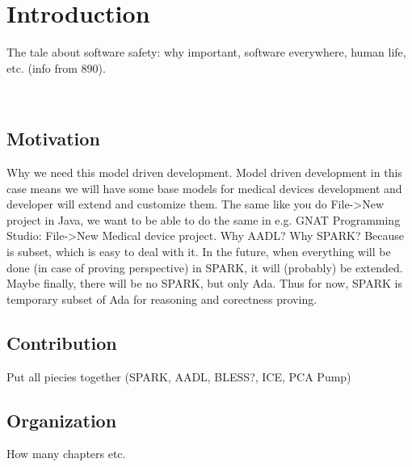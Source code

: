 
\cleardoublepage


\chapter{Introduction}
\label{introduction}

The tale about software safety: why important, software everywhere, human life, etc. (info from 890).

\

\section{Motivation}
\label{introduction:motivation}
Why we need this model driven development.
Model driven development in this case means we will have some base models for medical devices development and developer will extend and customize them. The same like you do File->New project in Java, we want to be able to do the same in e.g. GNAT Programming Studio: File->New Medical device project.
Why AADL?
Why SPARK? Because is subset, which is easy to deal with it. In the future, when everything will be done (in case of proving perspective) in SPARK, it will (probably) be extended. Maybe finally, there will be no SPARK, but only Ada. Thus for now, SPARK is temporary subset of Ada for reasoning and corectness proving.

\section{Contribution}
\label{introduction:contribution}
Put all piecies together (SPARK, AADL, BLESS?, ICE, PCA Pump)

\section{Organization}
\label{introduction:organization}
How many chapters etc.
